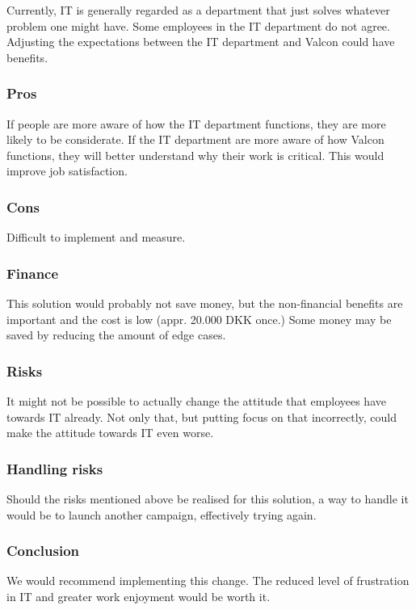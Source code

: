Currently, IT is generally regarded as a department that just solves whatever problem one might have. Some employees in the IT department do not agree. Adjusting the expectations between the IT department and Valcon could have benefits.

\subsubsection{Pros} 
If people are more aware of how the IT department functions, they are more likely to be considerate. If the IT department are more aware of how Valcon functions, they will better understand why their work is critical. This would improve job satisfaction.

\subsubsection{Cons}
Difficult to implement and measure. 

\subsubsection{Finance} 
This solution would probably not save money, but the non-financial benefits are important and the cost is low (appr. 20.000 DKK once.)
Some money may be saved by reducing the amount of edge cases.

\subsubsection{Risks}
It might not be possible to actually change the attitude that employees have towards IT already. Not only that, but putting focus on that incorrectly, could make the attitude towards IT even worse.

\subsubsection{Handling risks}
Should the risks mentioned above be realised for this solution, a way to handle it would be to launch another campaign, effectively trying again. 

\subsubsection{Conclusion} 
We would recommend implementing this change. 
The reduced level of frustration in IT and greater work enjoyment would be worth it.